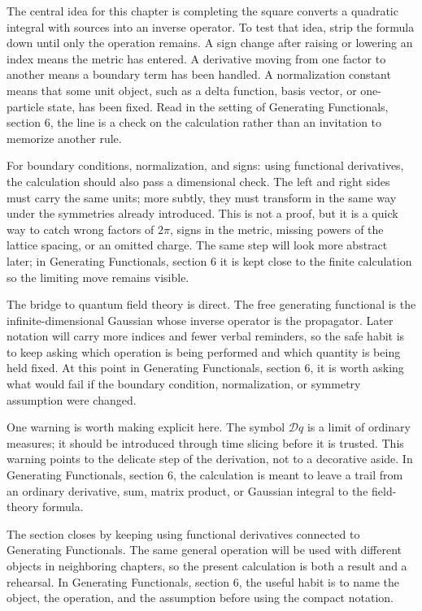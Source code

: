 The central idea for this chapter is completing the square converts a quadratic integral with sources into an inverse operator.  To test that idea, strip the formula down until only the operation remains.  A sign change after raising or lowering an index means the metric has entered.  A derivative moving from one factor to another means a boundary term has been handled.  A normalization constant means that some unit object, such as a delta function, basis vector, or one-particle state, has been fixed.  Read in the setting of Generating Functionals, section 6, the line is a check on the calculation rather than an invitation to memorize another rule.

For boundary conditions, normalization, and signs: using functional derivatives, the calculation should also pass a dimensional check.  The left and right sides must carry the same units; more subtly, they must transform in the same way under the symmetries already introduced.  This is not a proof, but it is a quick way to catch wrong factors of \(2\pi\), signs in the metric, missing powers of the lattice spacing, or an omitted charge.  The same step will look more abstract later; in Generating Functionals, section 6 it is kept close to the finite calculation so the limiting move remains visible.

The bridge to quantum field theory is direct.  The free generating functional is the infinite-dimensional Gaussian whose inverse operator is the propagator.  Later notation will carry more indices and fewer verbal reminders, so the safe habit is to keep asking which operation is being performed and which quantity is being held fixed.  At this point in Generating Functionals, section 6, it is worth asking what would fail if the boundary condition, normalization, or symmetry assumption were changed.

One warning is worth making explicit here.  The symbol \(\mathcal D q\) is a limit of ordinary measures; it should be introduced through time slicing before it is trusted.  This warning points to the delicate step of the derivation, not to a decorative aside.  In Generating Functionals, section 6, the calculation is meant to leave a trail from an ordinary derivative, sum, matrix product, or Gaussian integral to the field-theory formula.

The section closes by keeping using functional derivatives connected to Generating Functionals.  The same general operation will be used with different objects in neighboring chapters, so the present calculation is both a result and a rehearsal.  In Generating Functionals, section 6, the useful habit is to name the object, the operation, and the assumption before using the compact notation.



